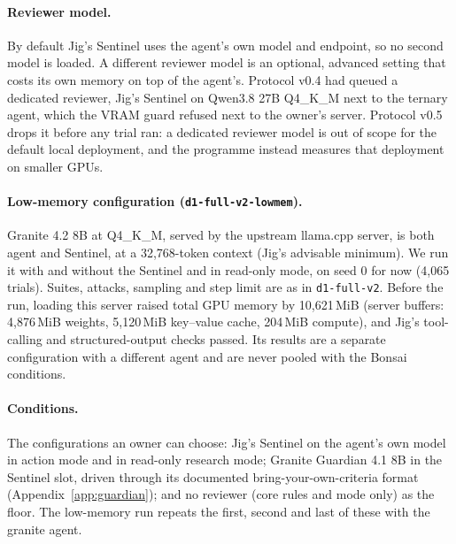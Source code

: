 \paragraph{Reviewer model.} By default Jig's Sentinel uses the agent's own model and endpoint, so no
second model is loaded. A different reviewer model is an optional, advanced setting that costs its own
memory on top of the agent's. Protocol v0.4 had queued a dedicated reviewer, Jig's Sentinel on Qwen3.8 27B
Q4\_K\_M next to the ternary agent, which the VRAM guard refused next to the owner's server. Protocol v0.5
drops it before any trial ran: a dedicated reviewer model is out of scope for the default local
deployment, and the programme instead measures that deployment on smaller GPUs.

\paragraph{Low-memory configuration (\texttt{d1-full-v2-lowmem}).} Granite 4.2 8B at Q4\_K\_M, served by the
upstream llama.cpp server, is both agent and Sentinel, at a 32{,}768-token context (Jig's advisable
minimum). We run it with and without the Sentinel and in read-only mode, on seed 0 for now (4{,}065 trials).
Suites, attacks, sampling and step limit are as in \texttt{d1-full-v2}. Before the run, loading this
server raised total GPU memory by 10{,}621\,MiB (server buffers: 4{,}876\,MiB weights, 5{,}120\,MiB
key--value cache, 204\,MiB compute), and Jig's tool-calling and structured-output checks passed. Its results
are a separate configuration with a different agent and are never pooled with the Bonsai conditions.

\paragraph{Conditions.} The configurations an owner can choose: Jig's Sentinel on the agent's own model
in action mode and in read-only research mode; Granite Guardian 4.1 8B in the Sentinel slot, driven
through its documented bring-your-own-criteria format (Appendix~\ref{app:guardian}); and no reviewer (core
rules and mode only) as the floor. The low-memory run repeats the first, second and last of these with the
granite agent.


